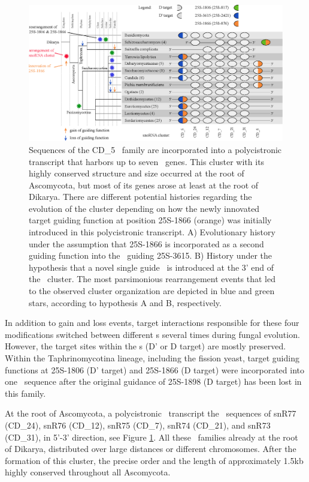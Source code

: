 \begin{figure}
  \centering
  \includegraphics[width=\textwidth]{pics/target_switches_CD_5_cluster.eps}
  \caption[Evolution of a \sno\ cluster harboring CD\_5
  sequences.]{Sequences of the CD\_5 \sno\ family are incorporated into a
    polycistronic transcript that harbors up to seven \sno\ genes. This
    cluster with its highly conserved structure and size occurred at the
    root of Ascomycota, but most of its genes arose at least at the root of
    Dikarya. There are different potential histories regarding the
    evolution of the cluster depending on how the newly innovated target
    guiding function at position 25S-1866 (orange) was initially introduced
    in this polycistronic transcript. A) Evolutionary history under the
    assumption that 25S-1866 is incorporated as a second guiding function
    into the \sno\ guiding 25S-3615. B) History under the hypothesis that a
    novel single guide \sno\ is introduced at the 3' end of the \sno\
    cluster. The most parsimonious rearrangement events that led to the
    observed cluster organization are depicted in blue and green stars,
    according to hypothesis A and B, respectively.}
\label{fig:CD_5_cluster_history}
\end{figure}

In addition to gain and loss events, target interactions responsible for
these four modifications switched between different \sno s several times
during fungal evolution. However, the target sites within the \sno s (D' or
D target) are mostly preserved. Within the Taphrinomycotina lineage,
including the fission yeast, target guiding functions at 25S-1806 (D'
target) and 25S-1866 (D target) were incorporated into one \sno\ sequence
after the original guidance of 25S-1898 (D target) has been lost in this family.

At the root of Ascomycota, a polycistronic \sno\ transcript 
the \sno\ sequences of snR77 (CD\_24), snR76 (CD\_12), snR75 (CD\_7), snR74
(CD\_21), and snR73 (CD\_31), \PFS{ordered} in 5'-3' direction, see Figure
\ref{fig:CD_5_cluster_history}.  All these \sno\ families \PFS{have been
  present} already at the root of Dikarya, distributed over large distances
or \PFS{over} different chromosomes. After the formation of this cluster,
the precise order and the length of approximately 1.5kb \PFS{remained}
highly conserved throughout all Ascomycota.

